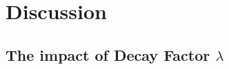 
\section{Discussion}
\label{sec:discussion}
\subsection{The impact of Decay Factor $\lambda$}
\label{sec:discsussion-lambda}


